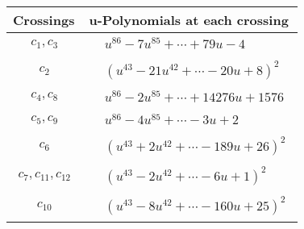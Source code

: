 \documentclass[1p]{elsarticle_modified}
\theoremstyle{definition}
\begin{document}
\begin{tabular}{m{50pt}|m{274pt}}
Crossings & \hspace{64pt}u-Polynomials at each crossing \\
\hline $$\begin{aligned}c_{1},c_{3}\end{aligned}$$&$\begin{aligned}
&u^{86}-7 u^{85}+\cdots+79 u-4
\end{aligned}$\\
\hline $$\begin{aligned}c_{2}\end{aligned}$$&$\begin{aligned}
&(u^{43}-21 u^{42}+\cdots-20 u+8)^{2}
\end{aligned}$\\
\hline $$\begin{aligned}c_{4},c_{8}\end{aligned}$$&$\begin{aligned}
&u^{86}-2 u^{85}+\cdots+14276 u+1576
\end{aligned}$\\
\hline $$\begin{aligned}c_{5},c_{9}\end{aligned}$$&$\begin{aligned}
&u^{86}-4 u^{85}+\cdots-3 u+2
\end{aligned}$\\
\hline $$\begin{aligned}c_{6}\end{aligned}$$&$\begin{aligned}
&(u^{43}+2 u^{42}+\cdots-189 u+26)^{2}
\end{aligned}$\\
\hline $$\begin{aligned}c_{7},c_{11},c_{12}\end{aligned}$$&$\begin{aligned}
&(u^{43}-2 u^{42}+\cdots-6 u+1)^{2}
\end{aligned}$\\
\hline $$\begin{aligned}c_{10}\end{aligned}$$&$\begin{aligned}
&(u^{43}-8 u^{42}+\cdots-160 u+25)^{2}
\end{aligned}$\\
\hline
\end{tabular}\\~\\
\newpage\renewcommand{\arraystretch}{1}
\end{document}

